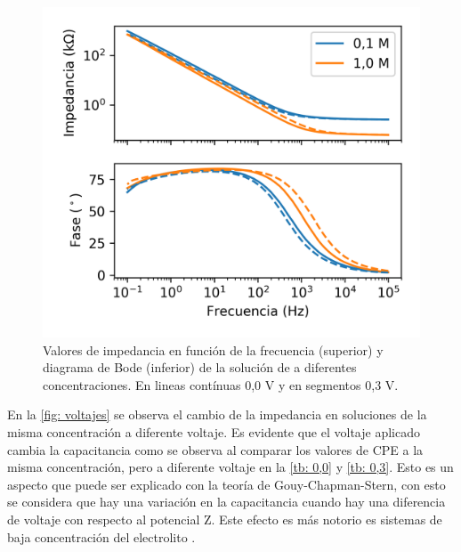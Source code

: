 \documentclass[fleqn,11pt]{SelfArx}
\begin{document}
	\begin{figure}[h]
		\centering
		\includegraphics[width = \linewidth]{LiClO4_voltages}
		\caption{Valores de impedancia en funci\'on de la frecuencia (superior) y diagrama de Bode (inferior) de la soluci\'on de  a diferentes concentraciones. En lineas cont\'inuas 0,0 V y en segmentos 0,3 V.}
		\label{fig: voltajes}
	\end{figure}
	
	En la \autoref{fig: voltajes} se observa el cambio de la impedancia en soluciones de la misma concentración a diferente voltaje. Es evidente que el voltaje aplicado cambia la capacitancia como se observa al comparar los valores de CPE a la misma concentración, pero a diferente voltaje en la \autoref{tb: 0,0} y \autoref{tb: 0,3}. Esto es un aspecto que puede ser explicado con la teoría de Gouy-Chapman-Stern, con esto se considera que hay una variación en la capacitancia cuando hay una diferencia de voltaje con respecto al potencial Z. Este efecto es más notorio es sistemas de baja concentración del electrolito \cite{bard2001fundamentals}.
	
\end{document}
